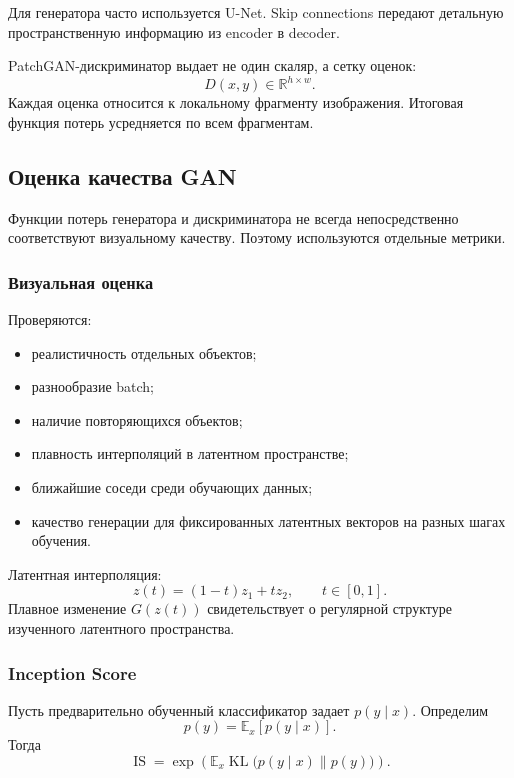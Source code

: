 \documentclass[12pt,a4paper]{article}
\newcommand{\R}{\mathbb{R}}
\newcommand{\E}{\mathbb{E}}
\newcommand{\KL}{\operatorname{KL}}
\numberwithin{equation}{section}
\theoremstyle{definition}
\theoremstyle{remark}
\begin{document}
Для генератора часто используется U-Net. Skip connections передают
детальную пространственную информацию из encoder в decoder.

PatchGAN-дискриминатор выдает не один скаляр, а сетку оценок:
\[
    D(x,y)\in\R^{h\times w}.
\]
Каждая оценка относится к локальному фрагменту изображения. Итоговая
функция потерь усредняется по всем фрагментам.

\subsection{Оценка качества GAN}

Функции потерь генератора и дискриминатора не всегда непосредственно
соответствуют визуальному качеству. Поэтому используются отдельные
метрики.

\subsubsection{Визуальная оценка}

Проверяются:

\begin{itemize}
    \item реалистичность отдельных объектов;
    \item разнообразие batch;
    \item наличие повторяющихся объектов;
    \item плавность интерполяций в латентном пространстве;
    \item ближайшие соседи среди обучающих данных;
    \item качество генерации для фиксированных латентных векторов на
    разных шагах обучения.
\end{itemize}

Латентная интерполяция:
\[
    z(t)=(1-t)z_1+tz_2,
    \qquad t\in[0,1].
\]
Плавное изменение \(G(z(t))\) свидетельствует о регулярной структуре
изученного латентного пространства.

\subsubsection{Inception Score}

Пусть предварительно обученный классификатор задает \(p(y\mid x)\).
Определим
\[
    p(y)=\E_x[p(y\mid x)].
\]
Тогда
\[
    \operatorname{IS}
    =
    \exp\left(
        \E_x
        \KL\bigl(
            p(y\mid x)\|p(y)
        \bigr)
    \right).
\]
\end{document}
